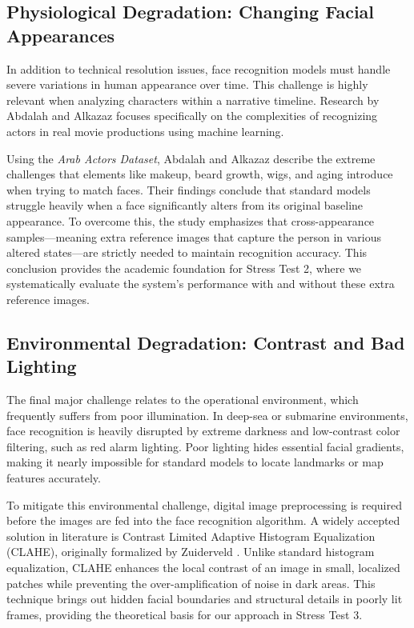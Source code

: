 \documentclass{article}
\begin{document}
\subsection{Physiological Degradation: Changing Facial Appearances}
In addition to technical resolution issues, face recognition models must handle severe variations in human appearance over time. This challenge is highly relevant when analyzing characters within a narrative timeline. Research by Abdalah and Alkazaz \cite{abdalah2025} focuses specifically on the complexities of recognizing actors in real movie productions using machine learning.

Using the \textit{Arab Actors Dataset}, Abdalah and Alkazaz \cite{abdalah2025} describe the extreme challenges that elements like makeup, beard growth, wigs, and aging introduce when trying to match faces. Their findings conclude that standard models struggle heavily when a face significantly alters from its original baseline appearance. To overcome this, the study emphasizes that cross-appearance samples---meaning extra reference images that capture the person in various altered states---are strictly needed to maintain recognition accuracy. This conclusion provides the academic foundation for Stress Test 2, where we systematically evaluate the system's performance with and without these extra reference images.

\subsection{Environmental Degradation: Contrast and Bad Lighting}
The final major challenge relates to the operational environment, which frequently suffers from poor illumination. In deep-sea or submarine environments, face recognition is heavily disrupted by extreme darkness and low-contrast color filtering, such as red alarm lighting. Poor lighting hides essential facial gradients, making it nearly impossible for standard models to locate landmarks or map features accurately.

To mitigate this environmental challenge, digital image preprocessing is required before the images are fed into the face recognition algorithm. A widely accepted solution in literature is Contrast Limited Adaptive Histogram Equalization (CLAHE), originally formalized by Zuiderveld \cite{zuiderveld1994}. Unlike standard histogram equalization, CLAHE enhances the local contrast of an image in small, localized patches while preventing the over-amplification of noise in dark areas. This technique brings out hidden facial boundaries and structural details in poorly lit frames, providing the theoretical basis for our approach in Stress Test 3.
\end{document}
